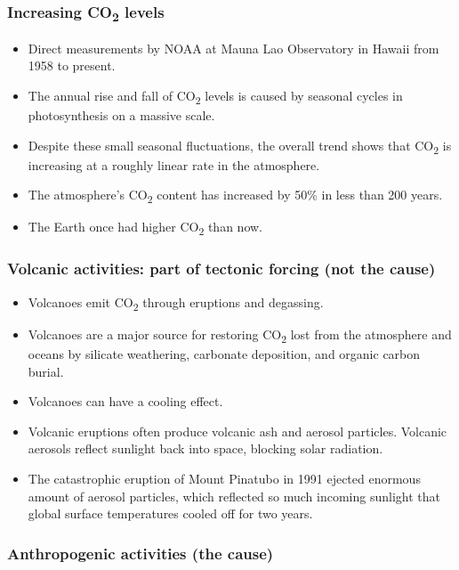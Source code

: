 \documentclass[11pt]{article}
\begin{document}
\subsubsection{Increasing CO\textsubscript{2} levels}
\label{sec:org9fc85b2}
\begin{itemize}
\item Direct measurements by NOAA at Mauna Lao Observatory in Hawaii from 1958 to present.
\item The annual rise and fall of CO\textsubscript{2} levels is caused by seasonal cycles in photosynthesis on a massive scale.
\item Despite these small seasonal fluctuations, the overall trend shows that CO\textsubscript{2} is increasing at a roughly linear rate in the atmosphere.
\item The atmosphere's CO\textsubscript{2} content has increased by 50\% in less than 200 years.
\item The Earth once had higher CO\textsubscript{2} than now.
\end{itemize}
\subsubsection{Volcanic activities: part of tectonic forcing (not the cause)}
\label{sec:org2d631e1}
\begin{itemize}
\item Volcanoes emit CO\textsubscript{2} through eruptions and degassing.
\item Volcanoes are a major source for restoring CO\textsubscript{2} lost from the atmosphere and oceans by silicate weathering, carbonate deposition, and organic carbon burial.
\item Volcanoes can have a cooling effect.
\item Volcanic eruptions often produce volcanic ash and aerosol particles. Volcanic aerosols reflect sunlight back into space, blocking solar radiation.
\item The catastrophic eruption of Mount Pinatubo in 1991 ejected enormous amount of aerosol particles, which reflected so much incoming sunlight that global surface temperatures cooled off for two years.
\end{itemize}

\newpage
\subsubsection{Anthropogenic activities (the cause)}
\label{sec:org780e420}
\end{document}
